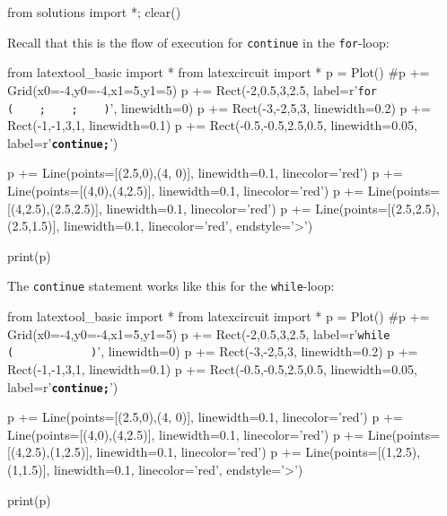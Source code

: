 \begin{python0}
from solutions import *; clear()
\end{python0}

Recall that this is the flow of execution for \texttt{continue} in the \texttt{for}-loop:
\begin{python}
from latextool_basic import *
from latexcircuit import *
p = Plot()
#p += Grid(x0=-4,y0=-4,x1=5,y1=5)
p += Rect(-2,0.5,3,2.5, label=r'\large{\texttt{for  (\ \ \ \ ;\ \ \ \ ;\ \ \ \ )}}', linewidth=0)
p += Rect(-3,-2,5,3, linewidth=0.2)
p += Rect(-1,-1,3,1, linewidth=0.1)
p += Rect(-0.5,-0.5,2.5,0.5, linewidth=0.05, label=r'\texttt{\textbf{continue;}}')


p += Line(points=[(2.5,0),(4, 0)], linewidth=0.1, linecolor='red')
p += Line(points=[(4,0),(4,2.5)], linewidth=0.1, linecolor='red')
p += Line(points=[(4,2.5),(2.5,2.5)], linewidth=0.1, linecolor='red')
p += Line(points=[(2.5,2.5),(2.5,1.5)], linewidth=0.1, linecolor='red', endstyle='>')

print(p)
\end{python}
The \texttt{continue} statement works like this for the \texttt{while}-loop:
\begin{python}
from latextool_basic import *
from latexcircuit import *
p = Plot()
#p += Grid(x0=-4,y0=-4,x1=5,y1=5)
p += Rect(-2,0.5,3,2.5, label=r'\large{\texttt{while  (\ \ \ \ \ \ \ \ \ \ \ \ )}}', linewidth=0)
p += Rect(-3,-2,5,3, linewidth=0.2)
p += Rect(-1,-1,3,1, linewidth=0.1)
p += Rect(-0.5,-0.5,2.5,0.5, linewidth=0.05, label=r'\texttt{\textbf{continue;}}')


p += Line(points=[(2.5,0),(4, 0)], linewidth=0.1, linecolor='red')
p += Line(points=[(4,0),(4,2.5)], linewidth=0.1, linecolor='red')
p += Line(points=[(4,2.5),(1,2.5)], linewidth=0.1, linecolor='red')
p += Line(points=[(1,2.5),(1,1.5)], linewidth=0.1, linecolor='red', endstyle='>')

print(p)
\end{python}

